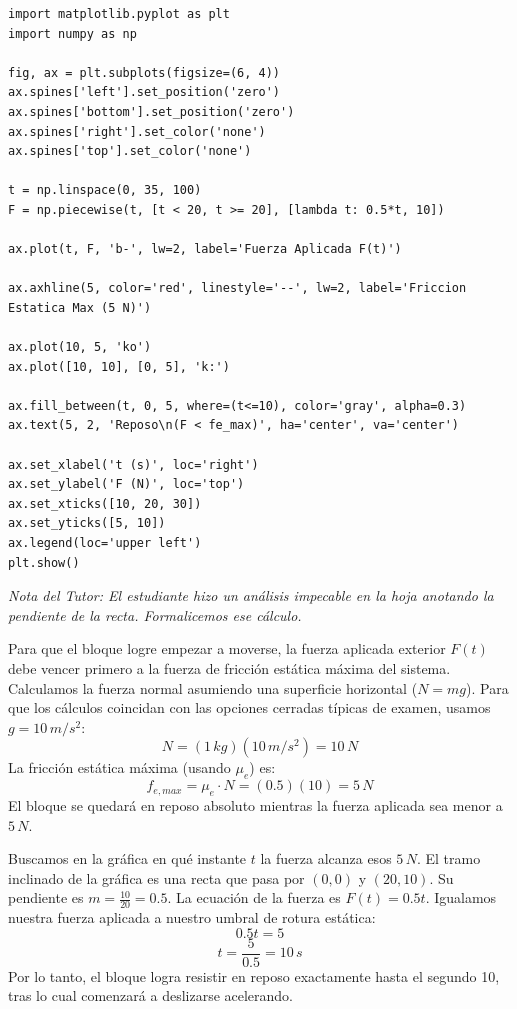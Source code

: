 \documentclass[12pt, a4paper]{article}
\begin{document}
\begin{verbatim}
import matplotlib.pyplot as plt
import numpy as np

fig, ax = plt.subplots(figsize=(6, 4))
ax.spines['left'].set_position('zero')
ax.spines['bottom'].set_position('zero')
ax.spines['right'].set_color('none')
ax.spines['top'].set_color('none')

t = np.linspace(0, 35, 100)
F = np.piecewise(t, [t < 20, t >= 20], [lambda t: 0.5*t, 10])

ax.plot(t, F, 'b-', lw=2, label='Fuerza Aplicada F(t)')

ax.axhline(5, color='red', linestyle='--', lw=2, label='Friccion Estatica Max (5 N)')

ax.plot(10, 5, 'ko')
ax.plot([10, 10], [0, 5], 'k:')

ax.fill_between(t, 0, 5, where=(t<=10), color='gray', alpha=0.3)
ax.text(5, 2, 'Reposo\n(F < fe_max)', ha='center', va='center')

ax.set_xlabel('t (s)', loc='right')
ax.set_ylabel('F (N)', loc='top')
ax.set_xticks([10, 20, 30])
ax.set_yticks([5, 10])
ax.legend(loc='upper left')
plt.show()
\end{verbatim}

\textit{Nota del Tutor: El estudiante hizo un análisis impecable en la hoja anotando la pendiente de la recta. Formalicemos ese cálculo.}

Para que el bloque logre empezar a moverse, la fuerza aplicada exterior $F(t)$ debe vencer primero a la fuerza de fricción estática máxima del sistema.
Calculamos la fuerza normal asumiendo una superficie horizontal ($N = mg$). Para que los cálculos coincidan con las opciones cerradas típicas de examen, usamos $g = 10\,\si{m/s^2}$:
$$ N = (1\,\si{kg})(10\,\si{m/s^2}) = 10\,\si{N} $$
La fricción estática máxima (usando $\mu_e$) es:
$$ f_{e,max} = \mu_e \cdot N = (0.5)(10) = 5\,\si{N} $$
El bloque se quedará en reposo absoluto mientras la fuerza aplicada sea menor a $5\,\si{N}$.

Buscamos en la gráfica en qué instante $t$ la fuerza alcanza esos $5\,\si{N}$. 
El tramo inclinado de la gráfica es una recta que pasa por $(0,0)$ y $(20,10)$. Su pendiente es $m = \frac{10}{20} = 0.5$. La ecuación de la fuerza es $F(t) = 0.5t$.
Igualamos nuestra fuerza aplicada a nuestro umbral de rotura estática:
$$ 0.5t = 5 $$
$$ t = \frac{5}{0.5} = 10\,\si{s} $$
Por lo tanto, el bloque logra resistir en reposo exactamente hasta el segundo 10, tras lo cual comenzará a deslizarse acelerando.
\end{document}
